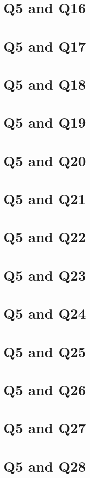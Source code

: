 \documentclass{report}
\begin{document}
\section{Q5 and Q16}\clearpage
\section{Q5 and Q17}\clearpage
\section{Q5 and Q18}\clearpage
\section{Q5 and Q19}\clearpage
\section{Q5 and Q20}\clearpage
\section{Q5 and Q21}\clearpage
\section{Q5 and Q22}\clearpage
\section{Q5 and Q23}\clearpage
\section{Q5 and Q24}\clearpage
\section{Q5 and Q25}\clearpage
\section{Q5 and Q26}\clearpage
\section{Q5 and Q27}\clearpage
\section{Q5 and Q28}\clearpage
\end{document}
